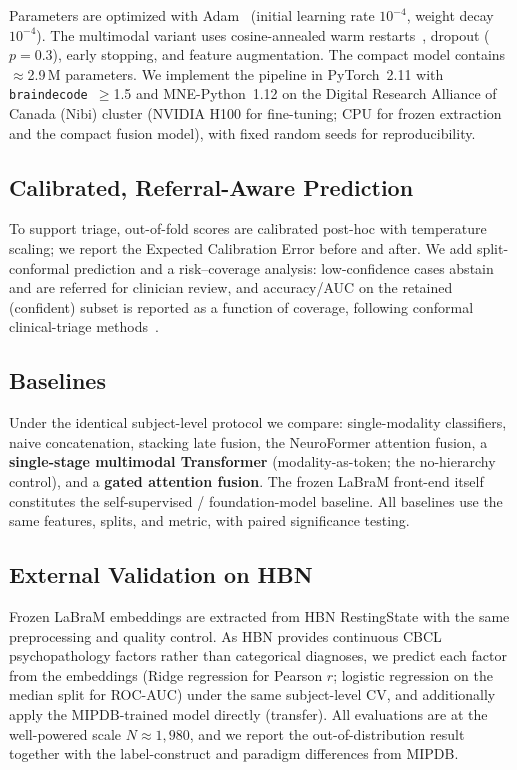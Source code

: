 Parameters are optimized with Adam~\cite{Kingma2015} (initial learning rate
$10^{-4}$, weight decay $10^{-4}$). The multimodal variant uses cosine-annealed warm
restarts~\cite{Loshchilov2017}, dropout ($p = 0.3$), early stopping, and feature
augmentation. The compact model contains $\approx$2.9\,M parameters. We implement the
pipeline in PyTorch~2.11 with \texttt{braindecode}~$\geq$1.5 and MNE-Python~1.12 on
the Digital Research Alliance of Canada (Nibi) cluster (NVIDIA H100 for fine-tuning;
CPU for frozen extraction and the compact fusion model), with fixed random seeds for
reproducibility.

\subsection{Calibrated, Referral-Aware Prediction}
To support triage, out-of-fold scores are calibrated post-hoc with temperature
scaling; we report the Expected Calibration Error before and after. We add
split-conformal prediction and a risk--coverage analysis: low-confidence cases
abstain and are referred for clinician review, and accuracy/AUC on the retained
(confident) subset is reported as a function of coverage, following conformal
clinical-triage methods~\cite{ConformalTriage2025}.

\subsection{Baselines}
Under the identical subject-level protocol we compare: single-modality classifiers,
naive concatenation, stacking late fusion, the NeuroFormer attention fusion, a
\textbf{single-stage multimodal Transformer} (modality-as-token; the no-hierarchy
control), and a \textbf{gated attention fusion}. The frozen LaBraM front-end itself
constitutes the self-supervised / foundation-model baseline. All baselines use the
same features, splits, and metric, with paired significance testing.

\subsection{External Validation on HBN}
\label{sec:external}
Frozen LaBraM embeddings are extracted from HBN RestingState with the same
preprocessing and quality control. As HBN provides continuous CBCL psychopathology
factors rather than categorical diagnoses, we predict each factor from the
embeddings (Ridge regression for Pearson $r$; logistic regression on the median split
for ROC-AUC) under the same subject-level CV, and additionally apply the
MIPDB-trained model directly (transfer). All evaluations are at the well-powered
scale $N \approx 1{,}980$, and we report the out-of-distribution result together with
the label-construct and paradigm differences from MIPDB.

